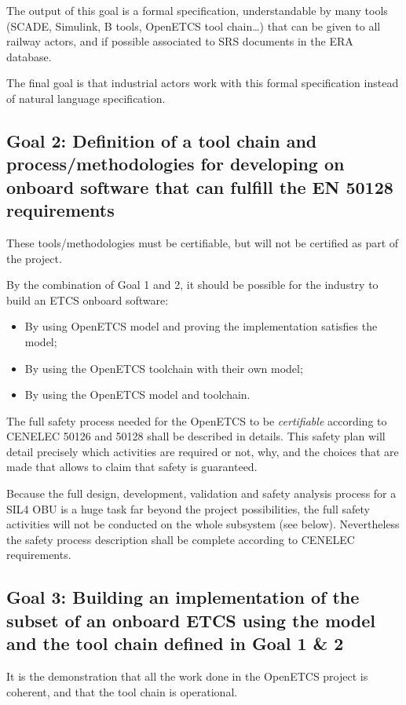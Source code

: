 \documentclass{template/openetcs_article}
\begin{document}
The output of this goal is a formal specification, understandable by many tools (SCADE, 
Simulink, B tools, OpenETCS tool chain…) that can be given to all railway actors, and 
if possible associated to SRS documents in the ERA database.

The final goal is that industrial actors work with this formal specification instead of 
natural language specification.

\subsection{Goal 2: Definition of a tool chain and process/methodologies for developing 
on onboard software that can fulfill the EN 50128 requirements}

These tools/methodologies must be certifiable, but will not be certified as part of the project.

By the combination of Goal 1 and 2, it should be possible for the industry to build an ETCS 
onboard software:
\begin{itemize}
\item By using OpenETCS model and proving the implementation satisfies the model;
\item By using the OpenETCS toolchain with their own model;
\item By using the OpenETCS model and toolchain.
\end{itemize}

The full safety process needed for the OpenETCS to be \emph{certifiable} according to CENELEC 50126
and 50128 shall be described in details. This safety plan will detail precisely which activities 
are required or not, why, and the choices that are made that allows to claim that safety is guaranteed.

Because the full design, development, validation and safety analysis process for a SIL4 OBU
is a huge task far beyond the project possibilities, the full safety activities will not be conducted
on the whole subsystem (see below). Nevertheless the safety process description shall be complete 
according to CENELEC requirements.

\subsection{Goal 3: Building an implementation of the subset of an onboard ETCS using the model and the 
tool chain defined in Goal 1 \& 2}

It is the demonstration that all the work done in the OpenETCS project is coherent, and that
the tool chain is operational.
\end{document}
